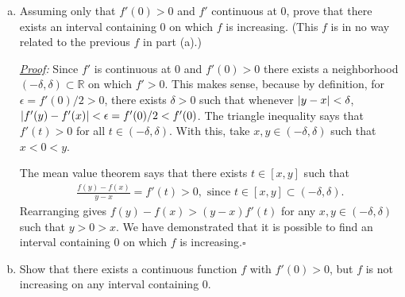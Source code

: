 \documentclass[11pt]{article}
\newcommand{\f}[2]{\frac{#1}{#2}}
\begin{document}
\begin{enumerate}[(a)]
	
	
	
	
	
	
	
	
	
	
	
	
	
	
	\item Assuming only that $f'(0) > 0$ and $f'$ continuous at $0$, prove that there exists an interval containing $0$ on which $f$ is increasing. (This $f$ is in no way related to the previous $f$ in part (a).)
	
	
	
	\noindent \textit{\underline{Proof}:} Since $f'$ is continuous at $0$ and $f'(0) > 0$ there exists a neighborhood $(-\delta,\delta) \subset \mathbb{R}$ on which $f' > 0$. This makes sense, because by definition, for $\epsilon = {f'(0)}/2 > 0$, there exists $\delta >0$ such that whenever $\abs{y-x} < \delta$, $\abs{f'(y) - f'(x)} < \epsilon = {f'(0)}/2 < f'(0)$. The triangle inequality says that $f'(t) > 0$ for all $t\in (-\delta, \delta)$. With this, take $x,y\in (-\delta,\delta)$ such that $x < 0 < y$.
	
	The mean value theorem says that there exists $t \in [x,y]$ such that 
	\begin{align*}
	\f{f(y) - f(x)}{y-x} = f'(t) > 0, \mbox{ since } t\in [x,y] \subset (-\delta,\delta).
	\end{align*}
	Rearranging gives $f(y) - f(x) > (y-x)f'(t)$ for any $x,y\in (-\delta,\delta)$ such that $y>0>x$. We have demonstrated that it is possible to find an interval containing $0$ on which $f$ is increasing.\hfill $\square$
	
	
	
	
	
	
	
	
	
	
	
	
	
	
	
	\item Show that there exists a continuous function $f$ with $f'(0) > 0$, but $f$ is not increasing on any interval containing $0$.
	

\end{enumerate}
\end{document}
